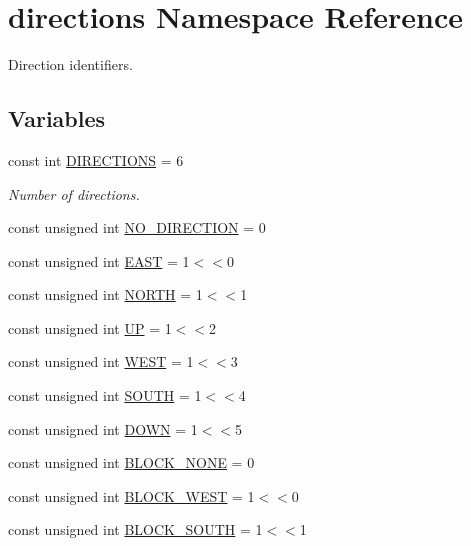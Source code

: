 \hypertarget{namespacedirections}{\section{directions Namespace Reference}
\label{namespacedirections}
}


Direction identifiers.  


\subsection*{Variables}
\begin{DoxyCompactItemize}
\item 
const int \hyperlink{namespacedirections_ae9cfa895df6c71a9a932353c2d698748}{D\-I\-R\-E\-C\-T\-I\-O\-N\-S} = 6
\begin{DoxyCompactList}\small\item\em Number of directions. \end{DoxyCompactList}\item 
const unsigned int \hyperlink{namespacedirections_a07f0f35a8e192bdbfbe343b4cc3ac5f0}{N\-O\-\_\-\-D\-I\-R\-E\-C\-T\-I\-O\-N} = 0
\item 
const unsigned int \hyperlink{namespacedirections_aaac74a9680a4a4485ea7966d9cc1e7a0}{E\-A\-S\-T} = 1$<$$<$0
\item 
const unsigned int \hyperlink{namespacedirections_abe28a39304326df4cd876a6f8267b8a0}{N\-O\-R\-T\-H} = 1$<$$<$1
\item 
const unsigned int \hyperlink{namespacedirections_a9164128a01e52cb46cea45b60d3e0d24}{U\-P} = 1$<$$<$2
\item 
const unsigned int \hyperlink{namespacedirections_a6050c968985dc0ca37f492dbd9665b59}{W\-E\-S\-T} = 1$<$$<$3
\item 
const unsigned int \hyperlink{namespacedirections_a01f808fbd532b480f6df835ba039eeb3}{S\-O\-U\-T\-H} = 1$<$$<$4
\item 
const unsigned int \hyperlink{namespacedirections_ac5b0521b6f55c6c27dd493c816eaf61a}{D\-O\-W\-N} = 1$<$$<$5
\item 
const unsigned int \hyperlink{namespacedirections_afb925db0683d3de68b06587ccc1be620}{B\-L\-O\-C\-K\-\_\-\-N\-O\-N\-E} = 0
\item 
const unsigned int \hyperlink{namespacedirections_ad1c6d7e5b1f142442ae7a7d527281e9f}{B\-L\-O\-C\-K\-\_\-\-W\-E\-S\-T} = 1$<$$<$0
\item 
const unsigned int \hyperlink{namespacedirections_a19a70e2862864e20ea8b52f15f18a4d4}{B\-L\-O\-C\-K\-\_\-\-S\-O\-U\-T\-H} = 1$<$$<$1

\end{DoxyCompactItemize}
